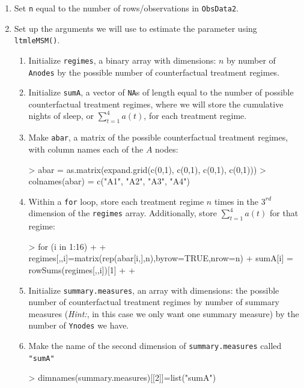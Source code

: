 \documentclass{exam}
\begin{document}
\begin{enumerate}
\item Set \texttt{n} equal to the number of rows/observations in \texttt{ObsData2}.
\item Set up the arguments we will use to estimate the parameter using \texttt{ltmleMSM()}.
\begin{enumerate}
\item Initialize \texttt{regimes}, a binary array with dimensions: $n$ by number of \texttt{Anodes} by the possible number of counterfactual treatment regimes.
\item Initialize \texttt{sumA}, a vector of \texttt{NA}s of length equal to the number of possible counterfactual treatment regimes, where we will store the cumulative nights of sleep, or $\sum_{t=1}^4a(t)$, for each treatment regime.
\item Make \texttt{abar}, a matrix of the possible counterfactual treatment regimes, with column names each of the $A$ nodes:
\begin{Schunk}
\begin{Sinput}
> abar = as.matrix(expand.grid(c(0,1), c(0,1), c(0,1), c(0,1)))
> colnames(abar) = c("A1", "A2", "A3", "A4")
\end{Sinput}
\end{Schunk}
\item Within a \texttt{for} loop, store each treatment regime $n$ times in the $3^{rd}$ dimension of the \texttt{regimes} array. Additionally, store $\sum_{t=1}^4a(t)$ for that regime:
\begin{Schunk}
\begin{Sinput}
> for (i in 1:16){
+   
+   regimes[,,i]=matrix(rep(abar[i,],n),byrow=TRUE,nrow=n)
+   sumA[i] = rowSums(regimes[,,i])[1]
+   
+ }
\end{Sinput}
\end{Schunk}
\item Initialize \texttt{summary.measures}, an array with dimensions: the possible number of counterfactual treatment regimes by number of summary measures (\textit{Hint:}, in this case we only want one summary measure) by the number of \texttt{Ynodes} we have.
\item Make the name of the second dimension of \texttt{summary.measures} called \texttt{"sumA"}
\begin{Schunk}
\begin{Sinput}
> dimnames(summary.measures)[[2]]=list("sumA")
\end{Sinput}
\end{Schunk}

\end{enumerate}
\end{enumerate}
\end{document}
